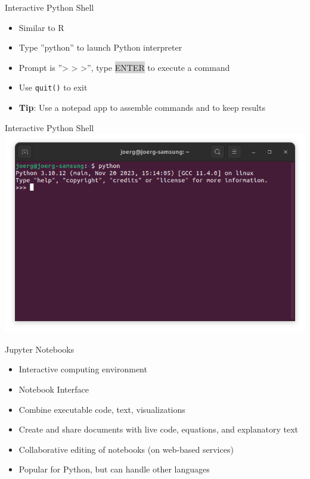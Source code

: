 \documentclass[ignorenonframetext,xcolor=x11names]{beamer}
\begin{document}
\begin{frame}{Interactive Python Shell}
\begin{itemize}
    \item Similar to R
    \item Type ''python'' to launch Python interpreter
    \item Prompt is ''> > >'', type \colorbox{lightgray}{ENTER} to execute a command
    \item Use \texttt{quit()} to exit
    \item \textbf{Tip}: Use a notepad app to assemble commands and to keep results
\end{itemize}
\end{frame}

\begin{frame}{Interactive Python Shell}
\centering
\includegraphics[width=\textwidth]{screen3.png}
\end{frame}

\begin{frame}{Jupyter Notebooks}
\begin{itemize}
    \item Interactive computing environment
    \item Notebook Interface
	\item Combine executable code, text, visualizations
	\item Create and share documents with live code, equations, and explanatory text
	\item Collaborative editing of notebooks (on web-based services)
	\item Popular for Python, but can handle other languages
\end{itemize}
\end{frame}
\end{document}
